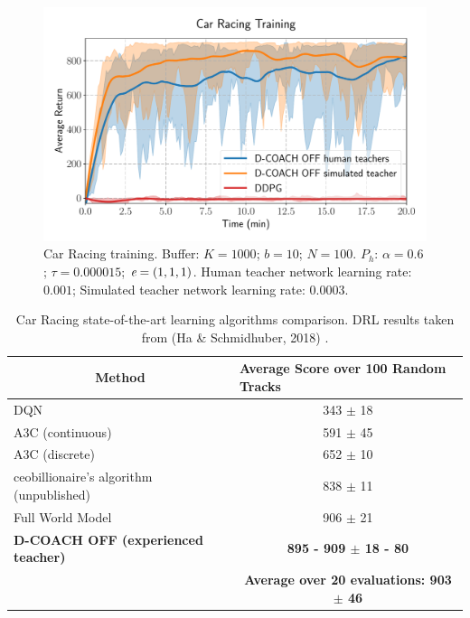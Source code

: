 \begin{figure}[h]
    \centering
    \includegraphics[width=0.7\linewidth]{imagenes/cap3/offline_car_racing_humans.pdf}
    \caption[Car Racing training.]{Car Racing training. Buffer: $K = 1000$; $b = 10$; $N = 100$. $P_{h}$: $\alpha = 0.6$; $\tau = 0.000015$; $\emph{e}=(1, 1, 1)$. Human teacher network learning rate: $0.001$; Simulated teacher network learning rate: $0.0003$.}
    \label{fig:racing_car_results1}
\end{figure}

\begin{table}[h]
\centering
\caption[Car Racing state-of-the-art learning algorithms comparison.]{Car Racing state-of-the-art learning algorithms comparison. DRL results taken from (Ha \& Schmidhuber, 2018) \cite{Ha2018}.}
\label{CarRacing_table}
\begin{tabular}{lc}
\multicolumn{1}{c}{\textbf{Method}}      & \multicolumn{1}{l}{\textbf{Average Score over 100 Random Tracks}} \\ \hline\hline
DQN                                      & 343 $\pm$ 18                                                      \\ \hline
A3C (continuous)                         & 591 $\pm$ 45                                                      \\ \hline
A3C (discrete)                           & 652 $\pm$ 10                                                      \\ \hline
ceobillionaire’s algorithm (unpublished) & 838 $\pm$ 11                                                      \\ \hline
Full World Model                         & 906 $\pm$ 21                                                      \\ \hline
\textbf{D-COACH OFF (experienced teacher)}                         & \textbf{895 - 909 $\pm$ 18 - 80} \\
& \textbf{Average over 20 evaluations: 903 $\pm$ 46}
\\ \hline
\end{tabular}
\end{table}


